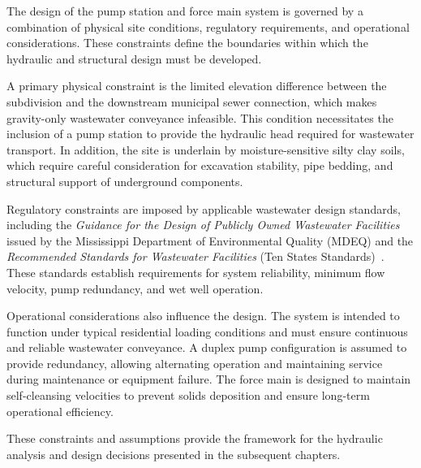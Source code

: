 The design of the pump station and force main system is governed by a combination of physical site conditions, regulatory requirements, and operational considerations. These constraints define the boundaries within which the hydraulic and structural design must be developed.

A primary physical constraint is the limited elevation difference between the subdivision and the downstream municipal sewer connection, which makes gravity-only wastewater conveyance infeasible. This condition necessitates the inclusion of a pump station to provide the hydraulic head required for wastewater transport. In addition, the site is underlain by moisture-sensitive silty clay soils, which require careful consideration for excavation stability, pipe bedding, and structural support of underground components.

Regulatory constraints are imposed by applicable wastewater design standards, including the \textit{Guidance for the Design of Publicly Owned Wastewater Facilities} issued by the Mississippi Department of Environmental Quality (MDEQ) and the \textit{Recommended Standards for Wastewater Facilities} (Ten States Standards)~\cite{MDEQ_DesignGuidance_2025,TenStates_RecommendedStandards_2014}. These standards establish requirements for system reliability, minimum flow velocity, pump redundancy, and wet well operation.

Operational considerations also influence the design. The system is intended to function under typical residential loading conditions and must ensure continuous and reliable wastewater conveyance. A duplex pump configuration is assumed to provide redundancy, allowing alternating operation and maintaining service during maintenance or equipment failure. The force main is designed to maintain self-cleansing velocities to prevent solids deposition and ensure long-term operational efficiency.

These constraints and assumptions provide the framework for the hydraulic analysis and design decisions presented in the subsequent chapters.
